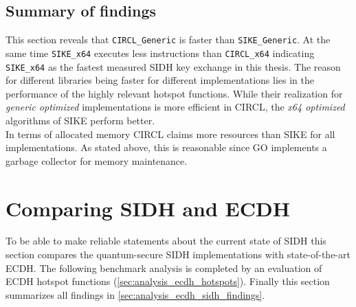 \subsection{Summary of findings}\label{sec:sike_circl_findings}

This section reveals that \texttt{CIRCL\_Generic} is faster than  \texttt{SIKE\_Generic}. At the same time \texttt{SIKE\_x64} executes less instructions than \texttt{CIRCL\_x64} indicating \texttt{SIKE\_x64} as the fastest measured \gls{SIDH} key exchange in this thesis. The reason for different libraries being faster for different implementations lies in the performance of the highly relevant hotspot functions. While their realization for \textit{generic optimized} implementations is more efficient in \gls{CIRCL}, the \textit{x64 optimized} algorithms of \gls{SIKE} perform better. \\
In terms of allocated memory  \gls{CIRCL} claims more resources than \gls{SIKE} for all implementations. As stated above, this is reasonable since GO implements a garbage collector for memory maintenance.

\section{Comparing \gls{SIDH} and \gls{ECDH}} \label{sec:analysis_effiency_ecdh}

To be able to make reliable statements about the current state of \gls{SIDH} this section compares the quantum-secure \gls{SIDH} implementations with state-of-the-art \gls{ECDH}. The following benchmark analysis is completed by an evaluation of \gls{ECDH} hotspot functions (\autoref{sec:analysis_ecdh_hotspots}). Finally this section summarizes all findings in \autoref{sec:analysis_ecdh_sidh_findings}.\\


